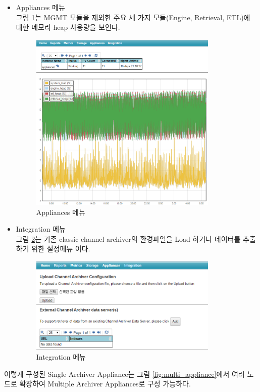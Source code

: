 \documentclass[11pt
  , a4paper
  , article
  , oneside
]{memoir}
\begin{document}
\begin{itemize}
	\item Appliances 메뉴 \\
	그림 \ref{fig:appliance}는 MGMT 모듈을 제외한 주요 세 가지 모듈(Engine, Retrieval, ETL)에 대한 메모리 heap 사용량을 보인다. 
	\begin{figure}[h!]
		\centering
		\includegraphics[width=0.85\textwidth, height=0.45\textwidth]{./images/appliance.eps}
		\caption{Appliances 메뉴}
		\label{fig:appliance} 
	\end{figure}
\clearpage
	\item Integration 메뉴 \\
	그림 \ref{fig:integration}는 기존 classic channel archiver의 환경파일을 Load 하거나 데이터를 추출하기 위한 설정메뉴 이다.
	\begin{figure}[h!]
		\centering
		\includegraphics[width=0.85\textwidth, height=0.3\textheight]{./images/integration.eps}
		\caption{Integration 메뉴}
		\label{fig:integration} 
	\end{figure}
\end{itemize}

이렇게 구성된 Single Archiver Appliance는 그림 \ref{fig:multi_appliance}에서 여러 노드로 확장하여 Multiple Archiver Appliances로 구성 가능하다.
\end{document}
